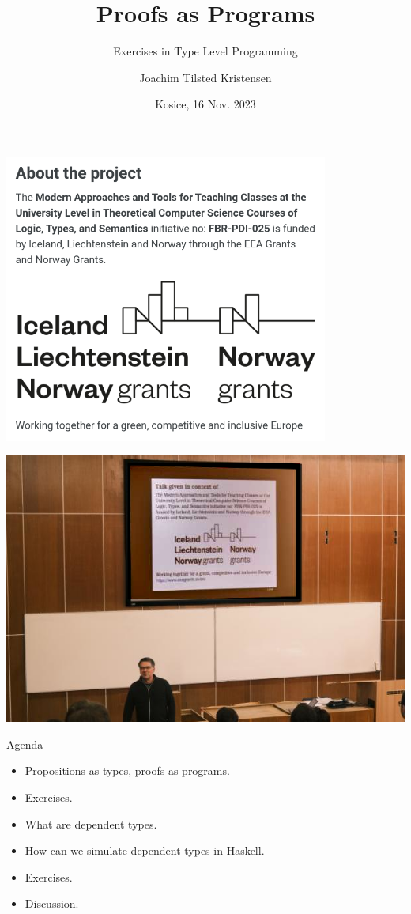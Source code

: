 \documentclass[dvipsnames]{beamer}
\title{Proofs as Programs}
\subtitle{Exercises in Type Level Programming}
\author{
  Joachim Tilsted Kristensen
}
\institute{
  Univertity of Oslo
}
\date{Kosice, 16 Nov. 2023}
\begin{document}
\frame{\titlepage \vspace{-0.5cm}}

\begin{frame}{}
  \begin{center}
    \includegraphics[width=0.8\textwidth]{logo}
  \end{center}
\end{frame}

\begin{frame}{}
  \includegraphics[width=\textwidth]{michael2}
\end{frame}

\begin{frame}{}
  \begin{center}
  \begin{block}{Agenda}
    \begin{itemize}
    \item Propositions as types, proofs as programs.
    \item Exercises.
    \item What are dependent types.
    \item How can we simulate dependent types in Haskell.
    \item Exercises.
    \item Discussion.
    \end{itemize}
  \end{block}
  \end{center}
\end{frame}
\end{document}
